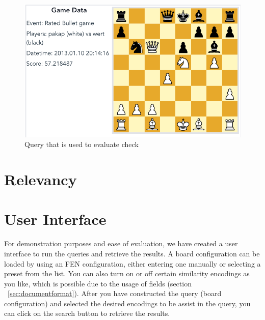 \documentclass[11pt]{article}
\begin{document}
    \begin{figure}[H]
        \centering
        \includegraphics[width=14cm]{images/BlackCheck1-BoReAtDeCh}
        \caption{Query that is used to evaluate check}
        \label{fig:BlackCheck2-BoReAtDeCh}
    \end{figure}


    \section{Relevancy}




    \section{User Interface}

    For demonstration purposes and ease of evaluation, we have created a user interface to run the queries and retrieve the results. A board configuration can be loaded by using an FEN configuration, either entering one manually or selecting a preset from the list. You can also turn on or off certain similarity encodings as you like, which is possible due to the usage of fields (section ~\ref{sec:documentformat}). After you have constructed the query (board configuration) and selected the desired encodings to be assist in the query, you can click on the search button to retrieve the results.
\end{document}

